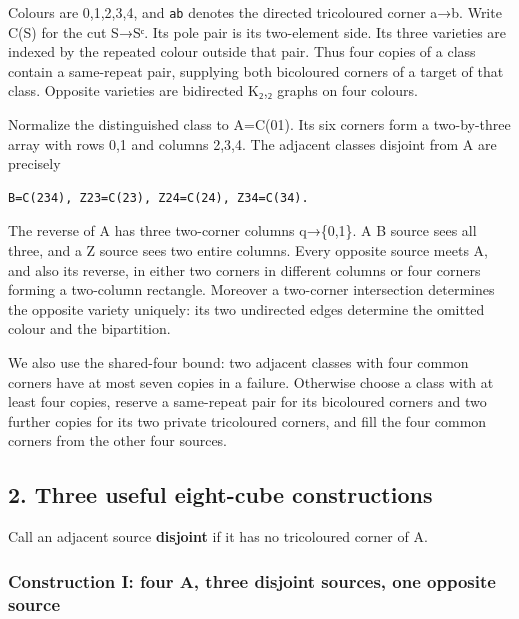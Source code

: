 \documentclass[
  10pt,
]{article}
\begin{document}
Colours are 0,1,2,3,4, and \texttt{ab} denotes the directed tricoloured
corner a→b. Write C(S) for the cut S→Sᶜ. Its pole pair is its
two-element side. Its three varieties are indexed by the repeated colour
outside that pair. Thus four copies of a class contain a same-repeat
pair, supplying both bicoloured corners of a target of that class.
Opposite varieties are bidirected K₂,₂ graphs on four colours.

Normalize the distinguished class to A=C(01). Its six corners form a
two-by-three array with rows 0,1 and columns 2,3,4. The adjacent classes
disjoint from A are precisely

\begin{verbatim}
B=C(234), Z23=C(23), Z24=C(24), Z34=C(34).
\end{verbatim}

The reverse of A has three two-corner columns q→\{0,1\}. A B source sees
all three, and a Z source sees two entire columns. Every opposite source
meets A, and also its reverse, in either two corners in different
columns or four corners forming a two-column rectangle. Moreover a
two-corner intersection determines the opposite variety uniquely: its
two undirected edges determine the omitted colour and the bipartition.

We also use the shared-four bound: two adjacent classes with four common
corners have at most seven copies in a failure. Otherwise choose a class
with at least four copies, reserve a same-repeat pair for its bicoloured
corners and two further copies for its two private tricoloured corners,
and fill the four common corners from the other four sources.

\hypertarget{three-useful-eight-cube-constructions}{%
\subsection*{2. Three useful eight-cube
constructions}\label{three-useful-eight-cube-constructions}}

Call an adjacent source \textbf{disjoint} if it has no tricoloured
corner of A.

\hypertarget{construction-i-four-a-three-disjoint-sources-one-opposite-source}{%
\subsubsection*{Construction I: four A, three disjoint sources, one
opposite
source}\label{construction-i-four-a-three-disjoint-sources-one-opposite-source}}
\end{document}
